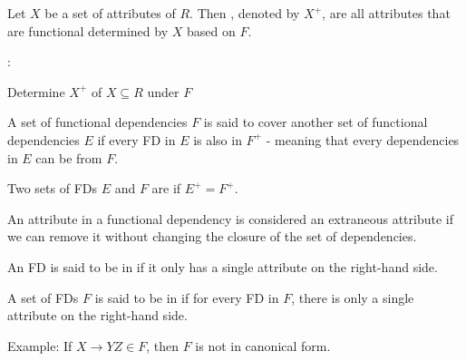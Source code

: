       \par Let $X$ be a set of attributes of $R$. Then , denoted by $X^{+}$, are all attributes that are functional determined by $X$ based on $F$.
      \par {}:
        \begin{algorithm}[H]
          \caption{Determine $X^{+}$ of $X \subseteq R$ under $F$}
        \end{algorithm}

        \par A set of functional dependencies $F$ is said to cover another set of functional dependencies $E$ if every FD in $E$ is also in $F^+$ - meaning that every dependencies in $E$ can be  from $F$.

        \par Two sets of FDs $E$ and $F$ are  if $E^+ = F^+$.
  
      \par An attribute in a functional dependency is considered an extraneous attribute if we can remove it without changing the closure of the set of dependencies.
    
      \par An FD is said to be in  if it only has a single attribute on the right-hand side.
      \par A set of FDs $F$ is said to be in  if for every FD in $F$, there is only a single attribute on the right-hand side.
      \par Example: If $X \to YZ \in F$, then $F$ is not in canonical form.
    
